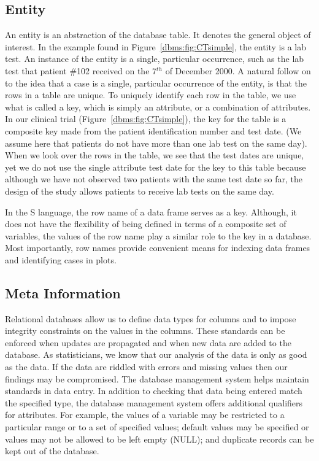 \subsection{Entity}
An entity is an abstraction of the database table.
It denotes the general object of interest.
In the example found in Figure~\ref{dbms:fig:CTsimple}, 
the entity is a lab test.
An instance of the entity is a single, particular occurrence, such
as the lab test that patient \#102 received on the 7$^{th}$ of December 2000.
A natural follow on to the idea that a case is a single, particular 
occurrence of the entity, is that the rows in a table are unique.
To uniquely identify each row in the table, we use what is called
a key, which is simply an attribute, or a combination of attributes.
In our clinical trial 
(Figure~\ref{dbms:fig:CTsimple}), 
the key for the table is a composite key made from 
the patient identification number and test date. 
(We assume here that patients do not have more than one lab 
test on the same day).
When we look over the rows in the table, we see that
the test dates are unique, yet we do not use the single attribute
test date for the key to this table because 
although we have not observed two patients with the same
test date so far, the design of the study 
allows patients to receive lab tests on the same day.

In the S language, the row name of a data frame serves as a key.
Although, it does not have the flexibility of being defined in terms
of a composite set of variables, the values of the row name play a similar
role to the key in a database. Most importantly, row names provide convenient
means for indexing data frames and identifying cases in plots. 


\subsection{Meta Information}
Relational databases allow us to define data types for columns and to
impose integrity constraints on the values in the columns.
These standards can be enforced when updates are propagated and 
when new data are added to the database.
As statisticians, we know that our analysis of the data is only
as good as the data. If the data are riddled with errors and missing values
then our findings may be compromised.  The database management system
helps maintain standards in data entry.
In addition to checking that data being entered match the specified type,
the database management system offers additional qualifiers for attributes.
For example, the values of a variable may be restricted to a particular
range or to a set of specified values; 
default values may be specified or values may not be allowed to be 
left empty (NULL); and 
duplicate records can be kept out of the database.


